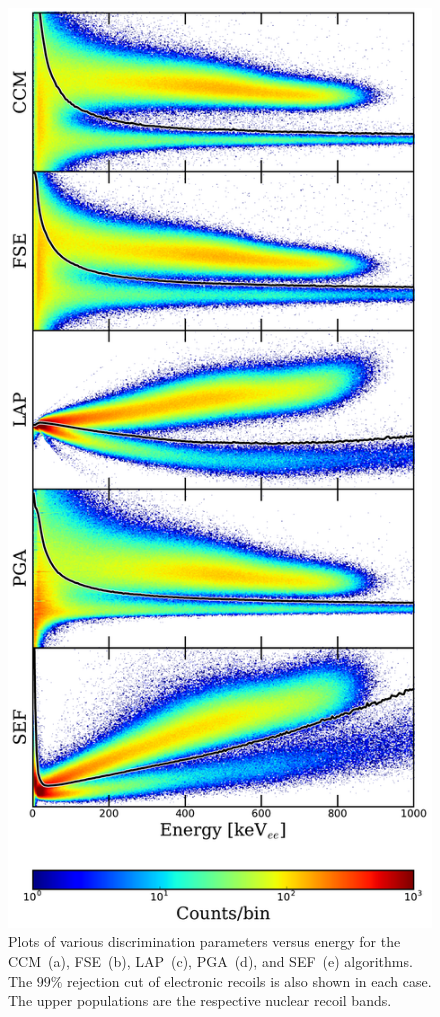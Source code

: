 \begin{figure}[htbp]
\centering
    \includegraphics[width=\columnwidth]{figures/psd/fig_discrim_hists}
    \caption{Plots of various discrimination parameters versus energy for the CCM~(a), FSE~(b), LAP~(c), PGA~(d), and SEF~(e) algorithms. The $99\%$ rejection cut of electronic recoils is also shown in each case. The upper populations are the respective nuclear recoil bands.}\label{fig:discrimination_plot}
\end{figure}

